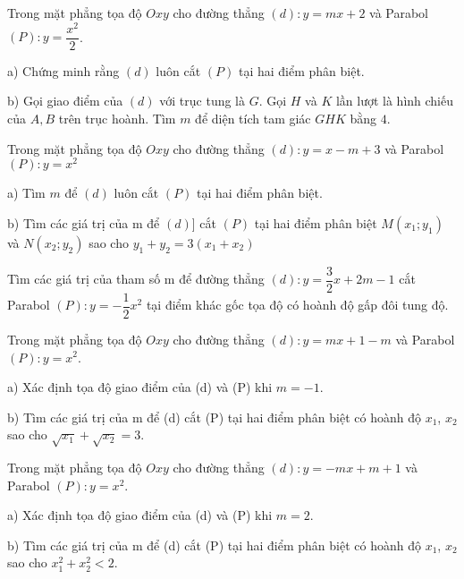 \begin{bt}
	Trong mặt phẳng tọa độ $Oxy$ cho đường thẳng $(d)\colon y=mx+2$ và Parabol $(P)\colon y=\dfrac{{{x}^{2}}}{2}$.
	
	a) Chứng minh rằng $\left( d \right)$ luôn cắt $\left( P \right)$ tại hai điểm phân biệt.
	
	b) Gọi giao điểm của $\left( d \right)$ với trục tung là $G$. Gọi $H$ và $K$ lần lượt là hình chiếu của $A, B$ trên trục hoành. Tìm $m$ để diện tích tam giác $GHK$ bằng $4$.
\end{bt}
\begin{bt}
	Trong mặt phẳng tọa độ $Oxy$ cho đường thẳng $(d)\colon y=x-m+3$ và Parabol $(P)\colon y={{x}^{2}}$
	
	a) Tìm $m$ để $\left( d \right)$ luôn cắt $\left( P \right)$ tại hai điểm phân biệt.
	
	b) Tìm các giá trị của m để $\left( d \right)$] cắt $\left( P \right)$ tại hai điểm phân biệt $M\left( {{x}_{1}};{{y}_{1}} \right)$ và $N\left( {{x}_{2}};{{y}_{2}} \right)$ sao cho ${{y}_{1}}+{{y}_{2}}=3\left( {{x}_{1}}+{{x}_{2}} \right)$
	
\end{bt}
\begin{bt}
	Tìm các giá trị của tham số m để đường thẳng $(d)\colon y=\dfrac{3}{2}x+2m-1$ cắt Parabol $(P)\colon y=-\dfrac{1}{2}{{x}^{2}}$ tại điểm khác gốc tọa độ có hoành độ gấp đôi tung độ.
%		
\end{bt}
\begin{bt}
	Trong mặt phẳng tọa độ $Oxy$ cho đường thẳng $(d)\colon y=mx+1-m$ và Parabol $(P)\colon y={{x}^{2}}$.
	
	a) Xác định tọa độ giao điểm của (d) và (P)  khi $m=-1$.
	
	b) Tìm các giá trị của m để (d)  cắt (P) tại hai điểm phân biệt có hoành độ ${{x}_{1}}$, ${{x}_{2}}$ sao cho $\sqrt{{{x}_{1}}}+\sqrt{{{x}_{2}}}=3$.
	
%		
\end{bt}
\begin{bt}
	Trong mặt phẳng tọa độ $Oxy$ cho đường thẳng $(d)\colon y=-mx+m+1$ và Parabol $(P)\colon y={{x}^{2}}$.
	
	a) Xác định tọa độ giao điểm của (d) và (P) khi $m=2$.
	
	b) Tìm các giá trị của m để (d)  cắt (P) tại hai điểm phân biệt có hoành độ ${{x}_{1}}$, ${{x}_{2}}$ sao cho $x_{1}^{2}+x_{2}^{2}<2$.
	
\end{bt}


